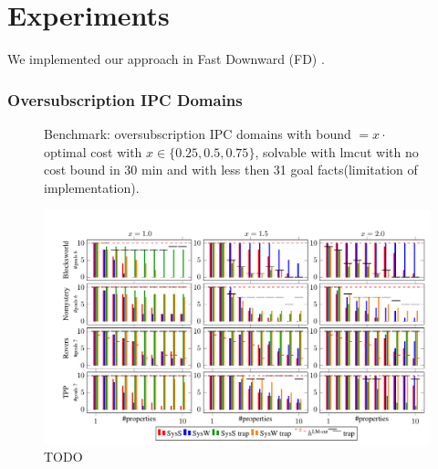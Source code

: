 


\newcommand{\scatterplotsize}{8cm}
\newcommand{\scatterplotxlabelshift}{1.5ex}
\newcommand{\scatterplotylabelshift}{-3ex}

\section{Experiments}
\label{experiments}

We implemented our approach in Fast Downward (FD) \cite{helmert:jair-06}.  


\subsubsection*{Oversubscription IPC Domains}

\setlength{\tabcolsep}{2pt}
\renewcommand{\arraystretch}{0.8}
\begin{figure}[ht]
	\tiny
	\centering  
	\caption{
		Benchmark: oversubscription IPC
		domains with bound $ = x \cdot $ optimal cost with $
		x \in \{0.25, 0.5, 0.75\}$, solvable with lmcut with no cost bound in 
		30 min and with less then 31 goal facts(limitation of implementation).
	}
	\label{table:coverage_ipc}
\end{figure}

\begin{figure}[t]
\centering\centering
%
\includegraphics{data/action_set_properties/barchart/barchart.pdf}
\caption{TODO}
\label{fig:barcharts}
\end{figure}

